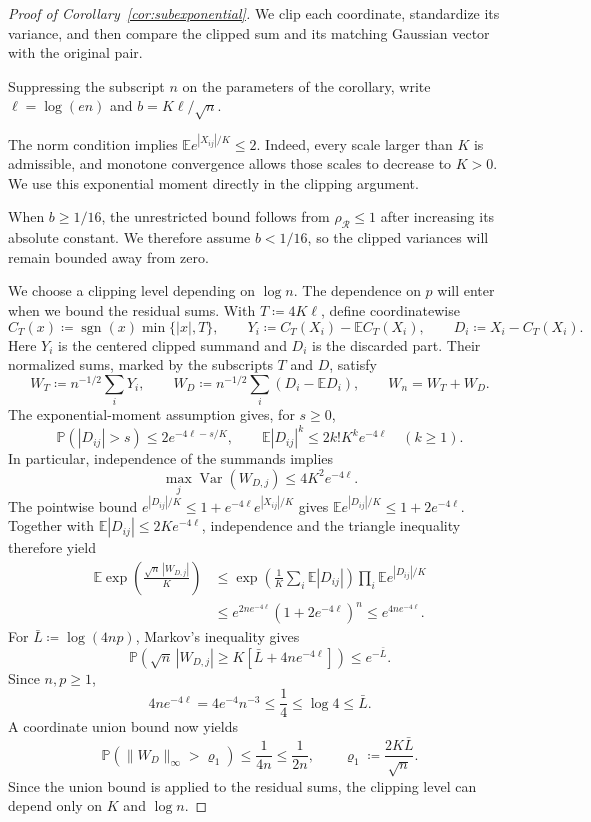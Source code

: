 \documentclass[11pt,letterpaper]{article}
\theoremstyle{remark}
\newcommand{\E}{\mathbb E}
\newcommand{\Pp}{\mathbb P}
\newcommand{\Var}{\operatorname{Var}}
\newcommand{\rh}{\rho_{\mathcal R}}
\begin{document}
\begin{proof}[Proof of Corollary~\ref{cor:subexponential}]

We clip each coordinate, standardize its variance, and then compare the
clipped sum and its matching Gaussian vector with the original pair.

Suppressing the subscript \(n\) on the parameters of the corollary,
write \(\ell=\log(en)\) and \(b=K\ell/\sqrt n\).

The norm condition implies \(\E e^{|X_{ij}|/K}\le2\). Indeed,
every scale larger than \(K\) is admissible, and monotone convergence
allows those scales to decrease to \(K>0\). We use this exponential
moment directly in the clipping argument.

When \(b\ge1/16\), the unrestricted bound follows from
\(\rh\le1\) after increasing its absolute constant. We therefore
assume \(b<1/16\), so the clipped variances will remain bounded
away from zero.

We choose a clipping level depending on \(\log n\). The dependence
on \(p\) will enter when we bound the residual sums. With \(T\coloneqq4K\ell\), define coordinatewise
\[
 C_T(x)\coloneqq \operatorname{sgn}(x)\min\{|x|,T\},\qquad
 Y_i\coloneqq C_T(X_i)-\E C_T(X_i),\qquad D_i\coloneqq X_i-C_T(X_i).
\]
Here \(Y_i\) is the centered clipped summand and \(D_i\) is the discarded
part. Their normalized sums, marked by the subscripts \(T\) and \(D\), satisfy
\[
 W_T\coloneqq n^{-1/2}\sum_iY_i,\qquad
 W_D\coloneqq n^{-1/2}\sum_i(D_i-\E D_i),\qquad W_n=W_T+W_D.
\]
The exponential-moment assumption gives, for \(s\ge0\),
\[
 \Pp(|D_{ij}|>s)\le2e^{-4\ell-s/K},\qquad
 \E|D_{ij}|^k\le2k!K^ke^{-4\ell}\quad(k\ge1).
\]
In particular, independence of the summands implies
\begin{equation}
 \max_j\Var(W_{D,j})\le4K^2e^{-4\ell}.
 \label{tail:residual-moments}
\end{equation}
The pointwise bound \(e^{|D_{ij}|/K}\le1+e^{-4\ell}e^{|X_{ij}|/K}\)
gives \(\E e^{|D_{ij}|/K}\le1+2e^{-4\ell}\). Together with
\(\E|D_{ij}|\le2Ke^{-4\ell}\), independence and the triangle inequality
therefore yield
\begin{align*}
 \E\exp\!\left(\frac{\sqrt n\,|W_{D,j}|}{K}\right)
 &\le\exp\!\left(\frac1K\sum_i\E|D_{ij}|\right)
          \prod_i\E e^{|D_{ij}|/K}\\
 &\le e^{2ne^{-4\ell}}(1+2e^{-4\ell})^n
 \le e^{4ne^{-4\ell}}.
\end{align*}
For \(\bar L\coloneqq \log(4np)\), Markov's inequality gives
\[
 \Pp\!\left(\sqrt n\,|W_{D,j}|\ge K[\bar L+4ne^{-4\ell}]\right)\le e^{-\bar L}.
\]
Since \(n,p\ge1\),
\[
 4ne^{-4\ell}=4e^{-4}n^{-3}\le\frac14\le\log4\le \bar L.
\]
A coordinate union bound now yields
\begin{equation}
 \Pp(\|W_D\|_\infty>\varrho_1)\le\frac1{4n}\le\frac1{2n},\qquad
 \varrho_1\coloneqq \frac{2K\bar L}{\sqrt n}.
 \label{tail:sum-coupling}
\end{equation}
Since the union bound is applied to the residual sums, the clipping
level can depend only on \(K\) and \(\log n\).


\end{proof}
\end{document}
